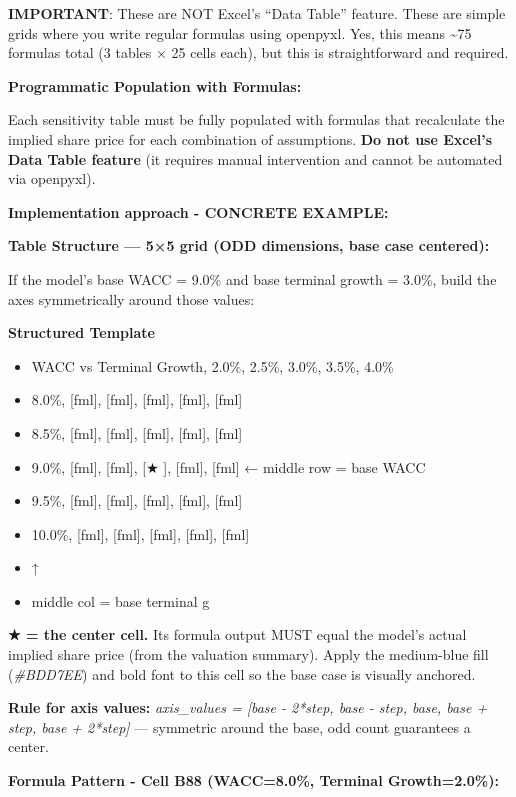 \documentclass[11pt]{article}
\begin{document}
\textbf{IMPORTANT}: These are NOT Excel's ``Data Table'' feature. These are simple grids where you write regular formulas using openpyxl. Yes, this means \textasciitilde{}75 formulas total (3 tables × 25 cells each), but this is straightforward and required.


\textbf{Programmatic Population with Formulas:}


Each sensitivity table must be fully populated with formulas that recalculate the implied share price for each combination of assumptions. \textbf{Do not use Excel's Data Table feature} (it requires manual intervention and cannot be automated via openpyxl).


\textbf{Implementation approach - CONCRETE EXAMPLE:}


\textbf{Table Structure — 5×5 grid (ODD dimensions, base case centered):}


If the model's base WACC = 9.0\% and base terminal growth = 3.0\%, build the axes symmetrically around those values:


\textbf{Structured Template}
\begin{itemize}[leftmargin=*,itemsep=2pt,topsep=2pt]
\item {} WACC vs Terminal Growth, 2.0\%, 2.5\%, 3.0\%, 3.5\%, 4.0\%
\item {} 8.0\%, [fml], [fml], [fml], [fml], [fml]
\item {} 8.5\%, [fml], [fml], [fml], [fml], [fml]
\item {} 9.0\%, [fml], [fml], [★ ], [fml], [fml] ← middle row = base WACC
\item {} 9.5\%, [fml], [fml], [fml], [fml], [fml]
\item {} 10.0\%, [fml], [fml], [fml], [fml], [fml]
\item {} ↑
\item {} middle col = base terminal g
\end{itemize}

\textbf{★ = the center cell.} Its formula output MUST equal the model's actual implied share price (from the valuation summary). Apply the medium-blue fill (\emph{\#BDD7EE}) and bold font to this cell so the base case is visually anchored.


\textbf{Rule for axis values:} \emph{axis\_\allowbreak{}values = [base - 2*step, base - step, base, base + step, base + 2*step]} — symmetric around the base, odd count guarantees a center.


\textbf{Formula Pattern - Cell B88 (WACC=8.0\%, Terminal Growth=2.0\%):}
\end{document}
